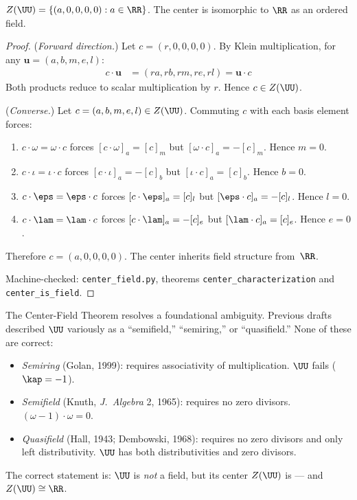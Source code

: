 \begin{theorem}{\label{thm:center-field}}
$Z(\UU) = \{(a, 0, 0, 0, 0) : a \in \RR\}$. The center is isomorphic to $\RR$ as an ordered field.
\end{theorem}

\begin{proof}
(\emph{Forward direction.}) Let $c = (r, 0, 0, 0, 0)$. By Klein multiplication, for any $\mathbf{u} = (a, b, m, e, l)$:
\begin{align*}
c \cdot \mathbf{u} &= (ra, rb, rm, re, rl) = \mathbf{u} \cdot c
\end{align*}
Both products reduce to scalar multiplication by $r$. Hence $c \in Z(\UU)$.

(\emph{Converse.}) Let $c = (a, b, m, e, l) \in Z(\UU)$. Commuting $c$ with each basis element forces:
\begin{enumerate}
\item $c \cdot \omega = \omega \cdot c$ forces $[c \cdot \omega]_a = [c]_m$ but $[\omega \cdot c]_a = -[c]_m$. Hence $m = 0$.
\item $c \cdot \iota = \iota \cdot c$ forces $[c \cdot \iota]_a = -[c]_b$ but $[\iota \cdot c]_a = [c]_b$. Hence $b = 0$.
\item $c \cdot \eps = \eps \cdot c$ forces $[c \cdot \eps]_a = [c]_l$ but $[\eps \cdot c]_a = -[c]_l$. Hence $l = 0$.
\item $c \cdot \lam = \lam \cdot c$ forces $[c \cdot \lam]_a = -[c]_e$ but $[\lam \cdot c]_a = [c]_e$. Hence $e = 0$.
\end{enumerate}
Therefore $c = (a, 0, 0, 0, 0)$. The center inherits field structure from~$\RR$.

Machine-checked: \texttt{center\_field.py}, theorems \texttt{center\_characterization} and \texttt{center\_is\_field}. \qedhere
\end{proof}

\begin{remark}
The Center-Field Theorem resolves a foundational ambiguity. Previous drafts described $\UU$ variously as a ``semifield,'' ``semiring,'' or ``quasifield.'' None of these are correct:
\begin{itemize}[noitemsep]
\item \emph{Semiring} (Golan, 1999): requires associativity of multiplication. $\UU$ fails ($\kap = -1$).
\item \emph{Semifield} (Knuth, \emph{J.~Algebra} 2, 1965): requires no zero divisors. $(\omega - 1) \cdot \omega = 0$.
\item \emph{Quasifield} (Hall, 1943; Dembowski, 1968): requires no zero divisors and only left distributivity. $\UU$ has both distributivities and zero divisors.
\end{itemize}
The correct statement is: $\UU$ is \emph{not} a field, but its center $Z(\UU)$ is --- and $Z(\UU) \cong \RR$.
\end{remark}


